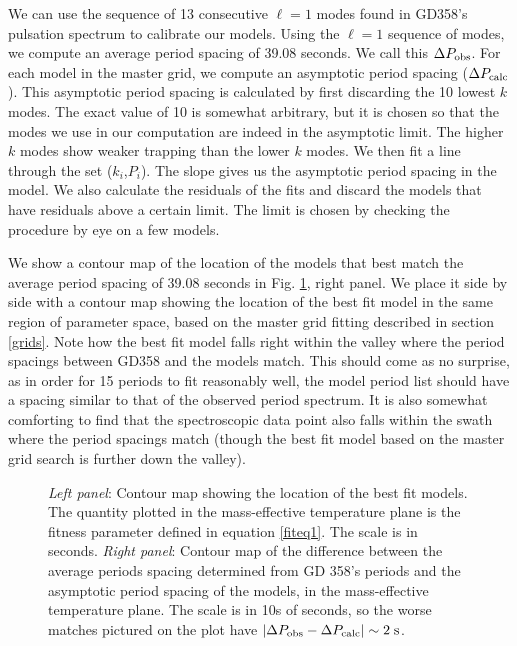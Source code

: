 \documentclass[12pt,preprint]{aastex}
\begin{document}
We can use the sequence of 13 consecutive $\ell=1$ modes found in GD358's pulsation spectrum to calibrate our models. 
Using the $\ell=1$ sequence of modes, we compute an average period spacing of 39.08 seconds. We call 
this $\Delta P_{\rm obs}$. For each model in the master grid, we compute an asymptotic period spacing 
($\Delta P_{\rm calc}$). This asymptotic period spacing is calculated by first discarding the 10 lowest $k$ modes. The exact value of 10 is somewhat arbitrary, but it is chosen so that the modes we use in 
our computation are indeed in the asymptotic limit. The higher $k$ modes show weaker trapping than the 
lower $k$ modes. We then fit a line through the set ($k_i$,$P_i$). The slope gives us the asymptotic 
period spacing in the model. We also calculate the residuals of the fits and discard the models that have residuals above a certain limit. The limit is chosen by checking the procedure 
by eye on a few models. 

We show a contour map of the location of the models that best match the average period spacing of 
39.08 seconds in Fig. \ref{ffit2}, right panel. We place it side by side with a contour map showing 
the location of the best fit model in the same region of parameter space, based on the master grid 
fitting described in section \ref{grids}. Note how the best fit model falls right within the valley 
where the period spacings between GD358 and the models match. This should come as no surprise, as in 
order for 15 periods to fit reasonably well, the model period list should have a spacing similar to 
that of the observed period spectrum. It is also somewhat comforting to find that the spectroscopic 
data point also falls within the swath where the period spacings match (though the best fit model 
based on the master grid search is further down the valley).

\begin{figure}
\caption{
{\it Left panel}: Contour map showing the location of the best fit models. The quantity plotted in 
the mass-effective temperature plane is the fitness parameter defined in equation \ref{fiteq1}. 
The scale is in seconds. {\it Right panel}: Contour map of the difference between the average 
periods spacing determined from GD 358's periods and the asymptotic period spacing of the models, 
in the mass-effective temperature plane. The scale is in 10s of seconds, so the worse matches 
pictured on the plot have $\left|\Delta P_{\rm obs}- \Delta P_{\rm calc}\right| \sim 2 \; \rm s$. \label{ffit2}
}
\end{figure}
\end{document}
